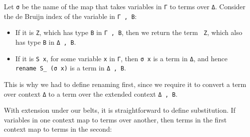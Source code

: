 Let \texttt{σ} be the name of the map that takes variables in \texttt{Γ}
to terms over \texttt{Δ}. Consider the de Bruijn index of the variable
in \texttt{Γ\ ,\ B}:

\begin{itemize}
\item
  If it is \texttt{Z}, which has type \texttt{B} in \texttt{Γ\ ,\ B},
  then we return the term \texttt{\textasciigrave{}\ Z}, which also has
  type \texttt{B} in \texttt{Δ\ ,\ B}.
\item
  If it is \texttt{S\ x}, for some variable \texttt{x} in \texttt{Γ},
  then \texttt{σ\ x} is a term in \texttt{Δ}, and hence
  \texttt{rename\ S\_\ (σ\ x)} is a term in \texttt{Δ\ ,\ B}.
\end{itemize}

This is why we had to define renaming first, since we require it to
convert a term over context \texttt{Δ} to a term over the extended
context \texttt{Δ\ ,\ B}.

With extension under our belts, it is straightforward to define
substitution. If variables in one context map to terms over another,
then terms in the first context map to terms in the second:

